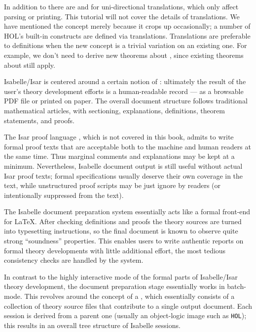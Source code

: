 \begin{isabellebody}
\begin{isamarkuptext}
In addition to \isa{{\isasymrightleftharpoons}} there are
\isa{{\isasymrightharpoonup}}
and \isa{{\isasymleftharpoondown}}
for uni-directional translations, which only affect
parsing or printing.  This tutorial will not cover the details of
translations.  We have mentioned the concept merely because it
crops up occasionally; a number of HOL's built-in constructs are defined
via translations.  Translations are preferable to definitions when the new
concept is a trivial variation on an existing one.  For example, we
don't need to derive new theorems about \isa{{\isasymnoteq}}, since existing theorems
about \isa{{\isacharequal}} still apply.%
%
%
\end{isamarkuptext}%
\isamarkuptrue%
%
\isamarkuptrue%
%
\begin{isamarkuptext}%
Isabelle/Isar is centered around a certain notion of : ultimately the result of the
  user's theory development efforts is a human-readable record --- as
  a browsable PDF file or printed on paper.  The overall document
  structure follows traditional mathematical articles, with
  sectioning, explanations, definitions, theorem statements, and
  proofs.

  The Isar proof language \cite{Wenzel-PhD}, which is not covered in
  this book, admits to write formal proof texts that are acceptable
  both to the machine and human readers at the same time.  Thus
  marginal comments and explanations may be kept at a minimum.
  Nevertheless, Isabelle document output is still useful without
  actual Isar proof texts; formal specifications usually deserve their
  own coverage in the text, while unstructured proof scripts may be
  just ignore by readers (or intentionally suppressed from the text).

  \medskip The Isabelle document preparation system essentially acts
  like a formal front-end for {\LaTeX}.  After checking definitions
  and proofs the theory sources are turned into typesetting
  instructions, so the final document is known to observe quite strong
  ``soundness'' properties.  This enables users to write authentic
  reports on formal theory developments with little additional effort,
  the most tedious consistency checks are handled by the system.%
\end{isamarkuptext}%
\isamarkuptrue%
%
\isamarkuptrue%
%
\begin{isamarkuptext}%
In contrast to the highly interactive mode of the formal parts of
  Isabelle/Isar theory development, the document preparation stage
  essentially works in batch-mode.  This revolves around the concept
  of a , which essentially consists of a collection
  of theory source files that contribute to a single output document.
  Each session is derived from a parent one (usually an object-logic
  image such as \texttt{HOL}); this results in an overall tree
  structure of Isabelle sessions.


\end{isamarkuptext}
\end{isabellebody}

